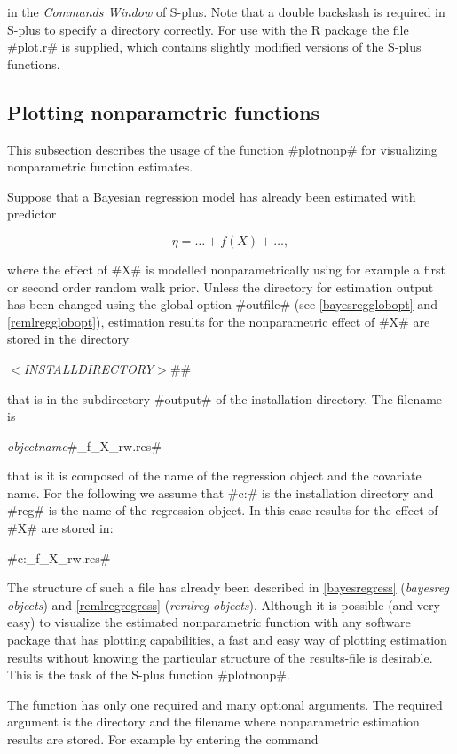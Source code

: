 in the {\em Commands Window} of S-plus. Note that a double backslash
is required in S-plus to specify a directory correctly. For use with
the R package the file #plot.r# is supplied, which contains slightly
modified versions of the S-plus functions.

\subsection{Plotting nonparametric functions} \label{splusplotnonp}

This subsection describes the usage of the function #plotnonp# for
visualizing nonparametric function estimates.

Suppose that a Bayesian regression model has already been
estimated with predictor

$$
\eta = \dots + f(X) + \dots,
$$

where the effect of #X# is modelled nonparametrically using for
example a first or second order random walk prior. Unless the
directory for estimation output has been changed using the global
option #outfile# (see \autoref{bayesregglobopt} and
\autoref{remlregglobopt}), estimation results for the
nonparametric effect of #X# are stored in the directory

{\em$<$INSTALLDIRECTORY$>$}#\output#

that is in the subdirectory #output# of the installation
directory. The filename is

{\em objectname}#_f_X_rw.res#

that is it is composed of the name of the regression object and
the covariate name. For the following we assume that #c:\bayes# is
the installation directory and #reg# is the name of the regression
object. In this case results for the effect of #X# are stored in:

#c:\bayes\output\reg_f_X_rw.res#

The structure of such a file has already been described in
\autoref{bayesregress} ({\em bayesreg objects}) and
\autoref{remlregregress} ({\em remlreg objects}). Although it is
possible (and very easy) to visualize the estimated nonparametric
function with any software package that has plotting capabilities, a
fast and easy way of plotting estimation results without knowing the
particular structure of the results-file is desirable. This is the
task of the S-plus function #plotnonp#.

The function has only one required and many optional arguments.
The required argument is the directory and the filename where
nonparametric estimation results are stored. For example by
entering the command

